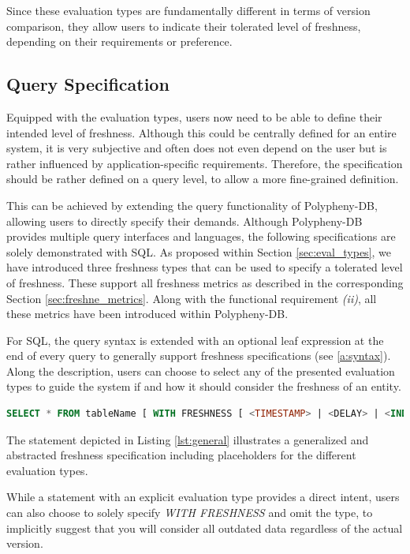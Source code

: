 Since these evaluation types are fundamentally different in terms of version comparison, they
allow users to indicate their tolerated level of freshness, depending on their requirements or preference. 



\subsection{Query Specification}
\label{sec:fresh_spec}

Equipped with the evaluation types, users now need to be able to define their intended level of freshness.
Although this could be centrally defined for an entire system, it is very subjective and often does not even depend on the user
but is rather influenced by application-specific requirements.
Therefore, the specification should be rather defined on a query level, to allow a more fine-grained definition.

This can be achieved by extending the query functionality of Polypheny-DB, allowing users to directly specify their demands.
Although Polypheny-DB provides multiple query interfaces and languages, the following specifications are solely demonstrated with SQL. 
As proposed within Section \ref{sec:eval_types}, we have introduced three freshness types that can be used to specify a tolerated level of freshness.
These support all freshness metrics as described in the corresponding Section \ref{sec:freshne_metrics}. Along with the functional 
requirement \textit{(ii)}, all these metrics have been introduced within Polypheny-DB.

For SQL, the query syntax is extended with an optional leaf expression at the end of every query to generally support freshness specifications (see \ref{a:syntax}). 
Along the description, users can choose to select any of the presented evaluation types to guide the system if and how it should consider the freshness of an entity.
\begin{lstlisting}[language=sql, caption={Generalized Freshness Specification},label={lst:general}]
SELECT * FROM tableName [ WITH FRESHNESS [ <TIMESTAMP> | <DELAY> | <INDEX> ] ];
\end{lstlisting}

The statement depicted in Listing \ref{lst:general} illustrates a generalized and abstracted freshness specification including placeholders for the different evaluation types.

While a statement with an explicit evaluation type provides a direct intent, users can also choose to solely specify \emph{WITH FRESHNESS} 
and omit the type, to implicitly suggest that you will consider all outdated data regardless of the actual version.





